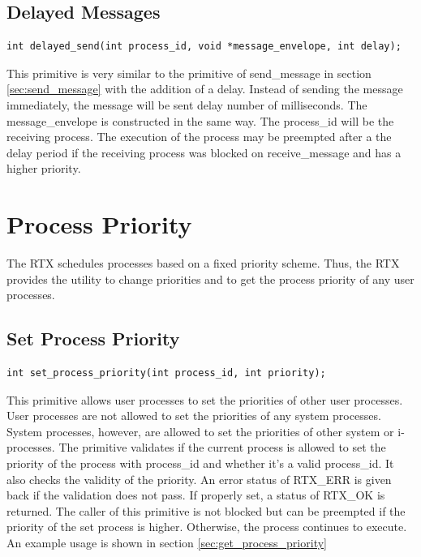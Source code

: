 \documentclass[12pt]{report}
\begin{document}
\subsection{Delayed Messages}
\begin{lstlisting}
int delayed_send(int process_id, void *message_envelope, int delay);
\end{lstlisting}

\par This primitive is very similar to the primitive of send\_message in section \ref{sec:send_message} with the addition of a delay. Instead of sending the message immediately, the message will be sent delay number of milliseconds. The message\_envelope is constructed in the same way. The process\_id will be the receiving process. The execution of the process may be preempted after a the delay period if the receiving process was blocked on receive\_message and has a higher priority.

\section{Process Priority}
\par The RTX schedules processes based on a fixed priority scheme. Thus, the RTX provides the utility to change priorities and to get the process priority of any user processes.

\subsection{Set Process Priority}
\label{sec:set_process_priority}
\begin{lstlisting}
int set_process_priority(int process_id, int priority);
\end{lstlisting}

This primitive allows user processes to set the priorities of other user processes. User processes are not allowed to set the priorities of any system processes. System processes, however, are allowed to set the priorities of other system or i-processes. The primitive validates if the current process is allowed to set the priority of the process with process\_id and whether it's a valid process\_id. It also checks the validity of the priority. An error status of RTX\_ERR is given back if the validation does not pass. If properly set, a status of RTX\_OK is returned. The caller of this primitive is not blocked but can be preempted if the priority of the set process is higher. Otherwise, the process continues to execute. An example usage is shown in section \ref{sec:get_process_priority}
\end{document}
